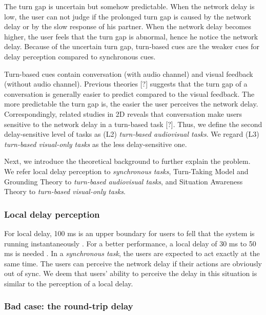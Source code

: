 The turn gap is uncertain but somehow predictable. When the network delay is low, the user can not judge if the prolonged turn gap is caused by the network delay or by the slow response of his partner. When the network delay becomes higher, the user feels that the turn gap is abnormal, hence he notice the network delay. Because of the uncertain turn gap, turn-based cues are the weaker cues for delay perception compared to synchronous cues.

Turn-based cues contain conversation (with audio channel) and visual feedback (without audio channel). Previous theories [?] suggests that the turn gap of a conversation is generally easier to predict compared to the visual feedback. The more predictable the turn gap is, the easier the user perceives the network delay. Correspondingly, related studies in 2D reveals that conversation make users sensitive to the network delay in a turn-based task [?]. Thus, we define the second delay-sensitive level of tasks as (L2) \emph{turn-based audiovisual tasks}. We regard (L3) \emph{turn-based visual-only tasks} as the less delay-sensitive one.

Next, we introduce the theoretical background to further explain the problem. We refer local delay perception to \emph{synchronous tasks}, Turn-Taking Model and Grounding Theory to \emph{turn-based audiovisual tasks}, and Situation Awareness Theory to \emph{turn-based visual-only tasks}.

\subsubsection{Local delay perception}

For local delay, 100 ms is an upper boundary for users to fell that the system is running instantaneously \cite{nielsen1993response}. For a better performance, a local delay of 30 ms to 50 ms is needed \cite{chen2007review}. In a \emph{synchronous task}, the users are expected to act exactly at the same time. The users can perceive the network delay if their actions are obviously out of sync. We deem that users' ability to perceive the delay in this situation is similar to the perception of a local delay.

\subsubsection{Bad case: the round-trip delay}

